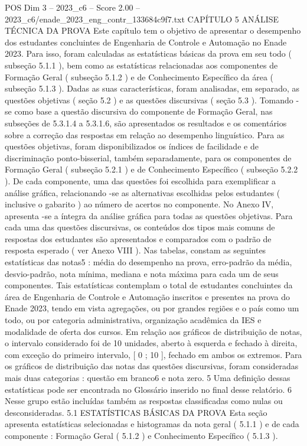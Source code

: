 \begin{textsample}{POS Dim 3 – 2023\_c6 – Score 2.00 – 2023\_c6/enade\_2023\_eng\_contr\_133684c9f7.txt}  \label{ex:f3_pos_104}
CAPÍTULO 5 ANÁLISE TÉCNICA DA PROVA Este capítulo tem o objetivo de apresentar o desempenho dos estudantes concluintes de Engenharia de Controle e Automação no Enade 2023.
Para isso, foram calculadas as estatísticas básicas da prova em seu todo ( subseção 5.1.1 ), bem como as estatísticas relacionadas aos componentes de Formação Geral ( subseção 5.1.2 ) e de Conhecimento Específico da área ( subseção 5.1.3 ).
Dadas as suas características, foram analisadas, em separado, as questões objetivas ( seção 5.2 ) e as questões discursivas ( seção 5.3 ).
Tomando -se como base a questão discursiva do componente de Formação Geral, nas subseções de 5.3.1.4 a 5.3.1.6, são apresentados os resultados e os comentários sobre a correção das respostas em relação ao desempenho linguístico.
Para as questões objetivas, foram disponibilizados os índices de facilidade e de discriminação ponto-bisserial, também separadamente, para os componentes de Formação Geral ( subseção 5.2.1 ) e de Conhecimento Específico ( subseção 5.2.2 ).
De cada componente, uma das questões foi escolhida para exemplificar a análise gráfica, relacionando -se as alternativas escolhidas pelos estudantes ( inclusive o gabarito ) ao número de acertos no componente.
No Anexo IV, apresenta -se a íntegra da análise gráfica para todas as questões objetivas.
Para cada uma das questões discursivas, os conteúdos dos tipos mais comuns de respostas dos estudantes são apresentados e comparados com o padrão de resposta esperado ( ver Anexo VIII ).
Nas tabelas, constam as seguintes estatísticas das notas5 : média do desempenho na prova, erro-padrão da média, desvio-padrão, nota mínima, mediana e nota máxima para cada um de seus componentes.
Tais estatísticas contemplam o total de estudantes concluintes da área de Engenharia de Controle e Automação inscritos e presentes na prova do Enade 2023, tendo em vista agregações, ou por grandes regiões e o país como um todo, ou por categoria administrativa, organização acadêmica da IES e modalidade de oferta dos cursos.
Em relação aos gráficos de distribuição de notas, o intervalo considerado foi de 10 unidades, aberto à esquerda e fechado à direita, com exceção do primeiro intervalo, [ 0 ; 10 ], fechado em ambos os extremos.
Para os gráficos de distribuição das notas das questões discursivas, foram consideradas mais duas categorias : questão em branco6 e nota zero. 5 Uma definição dessas estatísticas pode ser encontrada no Glossário inserido no final desse relatório. 6 Nesse grupo estão incluídas também as respostas classificadas como nulas ou desconsideradas. 5.1 ESTATÍSTICAS BÁSICAS DA PROVA Esta seção apresenta estatísticas selecionadas e histogramas da nota geral ( 5.1.1 ) e de cada componente : Formação Geral ( 5.1.2 ) e Conhecimento Específico ( 5.1.3 ).

\end{textsample}
